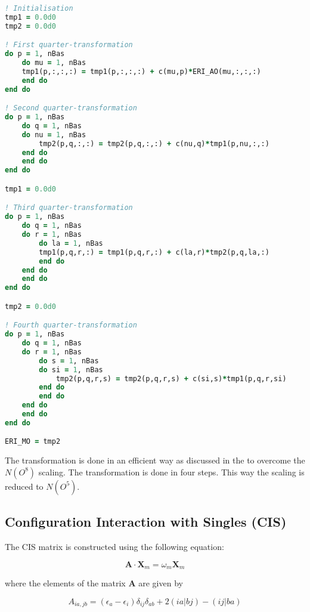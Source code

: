 \documentclass[12pt]{article}
\begin{document}
\begin{lstlisting}[language=Fortran, firstnumber=26, label={lst:AOtoMO}, caption=Subroutine for the \texttt{AO\_to\_MO} transformation. Only part of the full code is mentioned.]
! Initialisation
tmp1 = 0.0d0
tmp2 = 0.0d0

! First quarter-transformation
do p = 1, nBas
    do mu = 1, nBas
    tmp1(p,:,:,:) = tmp1(p,:,:,:) + c(mu,p)*ERI_AO(mu,:,:,:)
    end do
end do

! Second quarter-transformation
do p = 1, nBas
    do q = 1, nBas
    do nu = 1, nBas
        tmp2(p,q,:,:) = tmp2(p,q,:,:) + c(nu,q)*tmp1(p,nu,:,:)
    end do
    end do
end do

tmp1 = 0.0d0

! Third quarter-transformation
do p = 1, nBas
    do q = 1, nBas
    do r = 1, nBas
        do la = 1, nBas
        tmp1(p,q,r,:) = tmp1(p,q,r,:) + c(la,r)*tmp2(p,q,la,:)
        end do
    end do
    end do
end do

tmp2 = 0.0d0

! Fourth quarter-transformation
do p = 1, nBas
    do q = 1, nBas
    do r = 1, nBas
        do s = 1, nBas
        do si = 1, nBas
            tmp2(p,q,r,s) = tmp2(p,q,r,s) + c(si,s)*tmp1(p,q,r,si)
        end do
        end do
    end do
    end do
end do

ERI_MO = tmp2
\end{lstlisting}

The transformation is done in an efficient way as discussed in the \citep{goings2013aotomo} to overcome the $N(O^{8})$ scaling. The transformation is done in four steps. This way the scaling is reduced to $N(O^{5})$.

\subsection*{Configuration Interaction with Singles (CIS)}
The CIS matrix is constructed using the following equation:

\begin{equation}
    \mathbf{A} \cdot \mathbf{X}_m = \omega_m \mathbf{X}_m
\end{equation}

where the elements of the matrix \(\mathbf{A}\) are given by

\begin{equation}
    A_{ia, jb} = (\epsilon_a - \epsilon_i) \delta_{ij} \delta_{ab} + 2 (ia|bj) - (ij|ba)
\end{equation}
\end{document}

